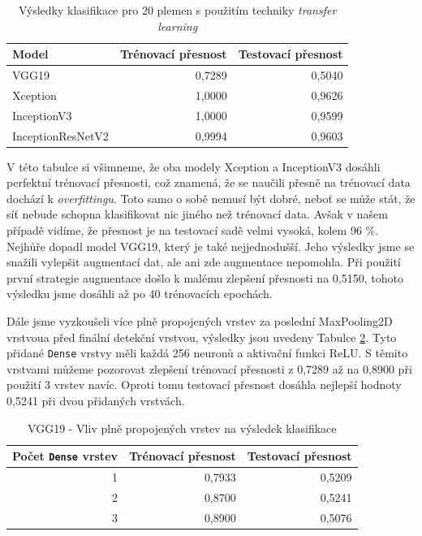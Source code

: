 \documentclass[a4paper,12pt]{article}
\begin{document}
\begin{table}[h!]
    \centering
    \begin{tabular}{l | r | r}
    \toprule
    Model               & Trénovací přesnost    & Testovací přesnost  \\\midrule
    VGG19               & 0,7289                & 0,5040              \\
    Xception            & 1,0000                & 0,9626              \\
    InceptionV3         & 1,0000                & 0,9599              \\
    InceptionResNetV2   & 0,9994                & 0,9603              \\
    \bottomrule
    \end{tabular}
    \caption{Výsledky klasifikace pro 20 plemen s použitím techniky \emph{transfer learning}}
    \label{tab:transfered_t20_results}
\end{table}

V této tabulce si všimneme, že oba modely Xception a InceptionV3 dosáhli perfektní trénovací přesnosti, což znamená, že se naučili přesně na trénovací data dochází k \emph{overfittingu}. Toto samo o sobě nemusí být dobré, neboť se může stát, že síť nebude schopna klasifikovat nic jiného než trénovací data. Avšak v našem případě vidíme, že přesnost je na testovací sadě velmi vysoká, kolem 96 \%. Nejhůře dopadl model VGG19, který je také nejjednodušší. Jeho výsledky jsme se snažili vylepšit augmentací dat, ale ani zde augmentace nepomohla. Při použití první strategie augmentace došlo k malému zlepšení přesnosti na 0,5150, tohoto výsledku jsme dosáhli až po 40 trénovacích epochách.

Dále jsme vyzkoušeli více plně propojených vrstev za poslední MaxPooling2D vrstvou\linebreak a před finální detekční vrstvou, výsledky jsou uvedeny Tabulce \ref{tab:vgg19_dense_test}.  Tyto přidané \texttt{Dense} vrstvy měli každá 256 neuronů a aktivační funkci ReLU. S těmito vrstvami můžeme pozorovat zlepšení trénovací přesnosti z 0,7289 až na 0,8900 při použití 3 vrstev navíc. Oproti tomu testovací přesnost dosáhla nejlepší hodnoty 0,5241 při dvou přidaných vrstvách.

\begin{table}[h!]
    \centering
    \begin{tabular}{r | r | r}
    \toprule
    Počet \texttt{Dense} vrstev & Trénovací přesnost    & Testovací přesnost  \\\midrule
    1                           & 0,7933                & 0,5209              \\
    2                           & 0,8700                & 0,5241              \\
    3                           & 0,8900                & 0,5076              \\
    \bottomrule
    \end{tabular}
    \caption{VGG19 - Vliv plně propojených vrstev na výsledek klasifikace}
    \label{tab:vgg19_dense_test}
\end{table}
\end{document}
